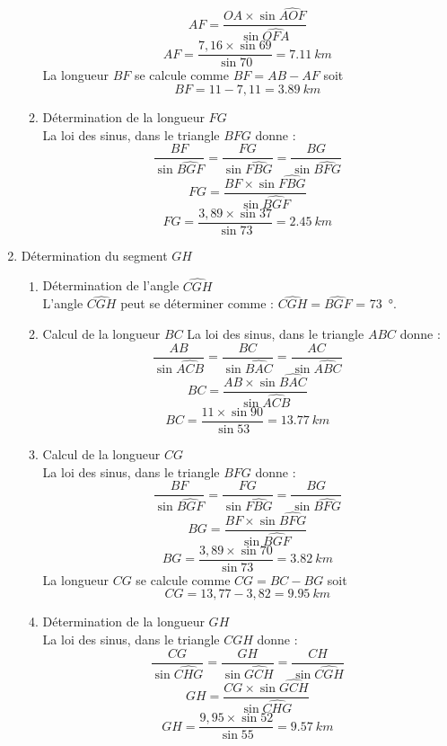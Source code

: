 \documentclass[a4paper,11pt,fleqn]{article}%
\begin{document}
\begin{multicols}{2}
\begin{enumerate}
\begin{enumerate}
             $$AF = \dfrac{OA \times \sin{\widehat{AOF}}}{\sin{\widehat{OFA}}}$$
            $$AF = \dfrac{7,16 \times \sin{69}}{\sin{70}} = \SI{7,11}{km}$$
            La longueur $BF$ se calcule comme $BF=AB-AF$ soit $$BF=11-7,11=\SI{3,89}{km}$$
            \item Détermination de la longueur $FG$\\
            La loi des sinus, dans le triangle $BFG$ donne : $$\dfrac{BF}{\sin{\widehat{BGF}}} = \dfrac{FG}{\sin{\widehat{FBG}}} = \dfrac{BG}{\sin{\widehat{BFG}}}$$
            $$FG = \dfrac{BF \times \sin{\widehat{FBG}}}{\sin{\widehat{BGF}}}$$
            $$FG = \dfrac{3,89 \times \sin{37}}{\sin{73}} = \SI{2,45}{km}$$
        \end{enumerate}
    \item Détermination du segment $GH$
        \begin{enumerate}
            \item Détermination de l'angle $\widehat{CGH}$\\
            L'angle $\widehat{CGH}$ peut se déterminer comme : $\widehat{CGH} = \widehat{BGF}$ = \SI{73}{\degree}.
            \item Calcul de la longueur $BC$
             La loi des sinus, dans le triangle $ABC$ donne : $$\dfrac{AB}{\sin{\widehat{ACB}}} = \dfrac{BC}{\sin{\widehat{BAC}}}=\dfrac{AC}{\sin{\widehat{ABC}}}$$
             $$BC=\dfrac{AB \times \sin{\widehat{BAC}}}{\sin{\widehat{ACB}}}$$
             $$BC=\dfrac{11 \times \sin{90}}{\sin{53}}=\SI{13,77}{km}$$
            \item Calcul de la longueur $CG$\\
            La loi des sinus, dans le triangle $BFG$ donne : $$\dfrac{BF}{\sin{\widehat{BGF}}} = \dfrac{FG}{\sin{\widehat{FBG}}} = \dfrac{BG}{\sin{\widehat{BFG}}}$$
            $$BG = \dfrac{BF \times \sin{\widehat{BFG}}}{\sin{\widehat{BGF}}}$$
            $$BG = \dfrac{3,89 \times \sin{70}}{\sin{73}} = \SI{3,82}{km}$$
            La longueur $CG$ se calcule comme $CG=BC-BG$ soit $$CG = 13,77 - 3,82 = \SI{9,95}{km}$$
            \item Détermination de la longueur $GH$\\
            La loi des sinus, dans le triangle $CGH$ donne : $$\dfrac{CG}{\sin{\widehat{CHG}}}=\dfrac{GH}{\sin{\widehat{GCH}}}=\dfrac{CH}{\sin{\widehat{CGH}}}$$
            $$GH=\dfrac{CG\times \sin{\widehat{GCH}}}{\sin{\widehat{CHG}}}$$
            $$GH=\dfrac{9,95\times \sin{52}}{\sin{55}}=\SI{9,57}{km}$$
        \end{enumerate}

\end{enumerate}
\end{multicols}
\end{document}
